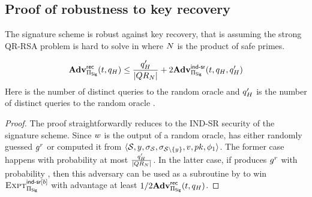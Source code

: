 \subsection{Proof of robustness to key recovery}

\begin{theorem}
\label{thm:robustness}
	The signature scheme \ourSigScheme is robust against key recovery, that is 
	assuming the strong QR-RSA problem is hard to solve in \qrGroup where $N$ is the product of safe primes.
	
	\[
	\recoverAdv \le   \frac{\oracleQueries' }{\setSize{\qrGroup}}  + 2 \Advantage{\indsrLabel}{\sigScheme}(\timeBound, 
	\oracleQueries, \oracleQueries')
	\]
Here \oracleQueries is the number of distinct queries to the random oracle \primeRO and 
$q_H'$ is the number of distinct queries to the random oracle \ro.

\end{theorem}

\begin{proof}
The proof straightforwardly reduces to the IND-SR security of the signature scheme. Since $\genericSigPair[2]$ is the output of a random oracle,  has either randomly guessed $\qrGen^{\genericRand}$ or computed it from $\langle \genericSetVar, \genericCInputElmt, \genericSig[\genericSetVar], \genericSig[\genericSetVar \setminus \{\genericCInputElmt\}],  \genericSigPair[1], \pubKey, \adversaryState{1} \rangle$. The former case happens with probability at most $\frac{q_H' }{\left|{QR_{N}}\right|} $. In the latter case, if  produces $\qrGen^{\genericRand}$ with probability \recoverAdv, then this adversary can be used as a subroutine by  to win $\Experiment{\indsrLabel[\indBit]}{\sigScheme}$ with advantage  at least $1/2 \mathbf{Adv}^{\scriptsize\textsf{rec}}_{\Pi_{\mathsf{Sig}} }(t, q_H)$. 
\end{proof}
\fi 
